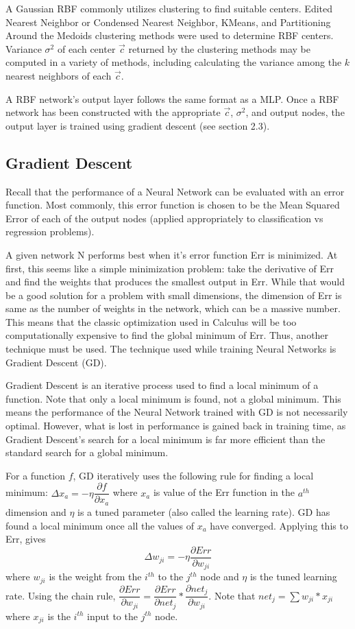 \documentclass[twoside,11pt]{article}
\begin{document}
	A Gaussian RBF commonly utilizes clustering to find suitable centers. Edited Nearest Neighbor or Condensed Nearest Neighbor, KMeans, and Partitioning Around the Medoids clustering methods were used to determine RBF centers. Variance $\sigma^2$ of each center $\vec c$ returned by the clustering methods may be computed in a variety of methods, including calculating the variance among the $k$ nearest neighbors of each $\vec c$.

	A RBF network's output layer follows the same format as a MLP. Once a RBF network has been constructed with the appropriate $\vec c$, $\sigma^2$, and output nodes, the output layer is trained using gradient descent (see section 2.3).

\subsection{Gradient Descent}
Recall that the performance of a Neural Network can be evaluated with an error function.
Most commonly, this error function is chosen to be the Mean Squared Error of each of the output nodes (applied appropriately to classification vs regression problems).

A given network N performs best when it's error function Err is minimized.
At first, this seems like a simple minimization problem: take the derivative of Err and find the weights that produces the smallest output in Err.
While that would be a good solution for a problem with small dimensions, the dimension of Err is same as the number of weights in the network, which can be a massive number.
This means that the classic optimization used in Calculus will be too computationally expensive to find the global minimum of Err. Thus, another technique must be used.
The technique used while training Neural Networks is Gradient Descent (GD).

Gradient Descent is an iterative process used to find a local minimum of a function. Note that only a local minimum is found, not a global minimum.
This means the performance of the Neural Network trained with GD is not necessarily optimal.
However, what is lost in performance is gained back in training time, as Gradient Descent's search for a local minimum is far more efficient than the standard search for a global minimum.

For a function $f$, GD iteratively uses the following rule for finding a local minimum:
$\Delta x_a = - \eta \dfrac{\partial f}{\partial x_a}$ where $x_a$ is value of the Err function in the $a^{th}$ dimension and $\eta$ is a tuned parameter (also called the learning rate). GD has found a local minimum once all the values of $x_a$ have converged.
Applying this to Err, gives
$$\Delta w_{ji} = - \eta \dfrac{\partial Err}{\partial w_{ji}}$$
where $w_{ji}$ is the weight from the $i^{th}$ to the $j^{th}$ node and $\eta$ is the tuned learning rate. Using the chain rule,
$\dfrac{\partial Err}{\partial w_{ji}} = \dfrac{\partial Err}{\partial net_{j}} * \dfrac{\partial net_j}{\partial w_{ji}}$. Note that $net_j = \sum w_{ji} * x_{ji}$ where $x_{ji}$ is the $i^{th}$ input to the $j^{th}$ node.
\end{document}
